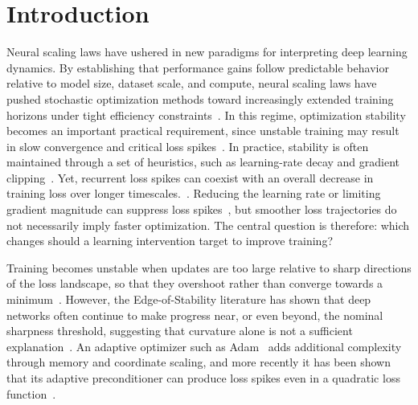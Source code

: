 \section{Introduction}
\label{sec:introduction}


Neural scaling laws have ushered in new paradigms for interpreting deep learning dynamics. By establishing that performance gains follow predictable behavior relative to model size, dataset scale, and compute, neural scaling laws have pushed stochastic optimization methods toward increasingly extended training horizons under tight efficiency constraints~\cite{hestness2017deep, kaplan2020scaling, henighan2020scaling, hoffmann2022chinchilla}. In this regime, optimization stability becomes an important practical requirement, since unstable training may result in slow convergence and critical loss spikes~\cite{bai2026spikes}. In practice, stability is often maintained through a set of heuristics, such as learning-rate decay and gradient clipping~\cite{loshchilov2016sgdr,pascanu2013difficulty,bai2026spikes}. Yet, recurrent loss spikes can coexist with an overall decrease in training loss over longer timescales.~\cite{cohen2021edge,damian2023self}. Reducing the learning rate or limiting gradient magnitude can suppress loss spikes~\cite{smith2017cyclical,pascanu2013difficulty}, but smoother loss trajectories do not necessarily imply faster optimization. The central question is therefore: which changes should a learning intervention target to improve training?

Training becomes unstable when updates are too large relative to sharp directions of the loss landscape, so that they overshoot rather than converge towards a minimum~\cite{polyak1964methods, bertsekas1997nonlinear}. However, the Edge-of-Stability literature has shown that deep networks often continue to make progress near, or even beyond, the nominal sharpness threshold, suggesting that curvature alone is not a sufficient explanation~\cite{cohen2021edge, arora2022understanding, damian2023self}. An adaptive optimizer such as Adam~\cite{kingma2014adam} adds additional complexity through memory and coordinate scaling, and more recently it has been shown that its adaptive preconditioner can produce loss spikes even in a quadratic loss function~\cite{bai2026spikes}.

